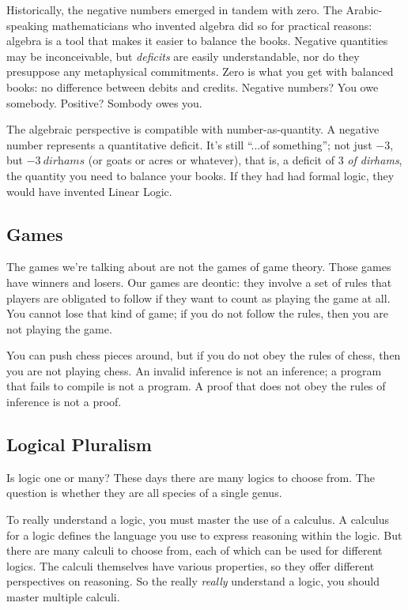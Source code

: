 \documentclass{article}
\begin{document}
Historically, the negative numbers emerged in tandem with zero. The
Arabic-speaking mathematicians who invented algebra did so for
practical reasons: algebra is a tool that makes it easier to balance
the books. Negative quantities may be inconceivable, but
\textit{deficits} are easily understandable, nor do they presuppose
any metaphysical commitments. Zero is what you get with balanced
books: no difference between debits and credits. Negative numbers? You
owe somebody. Positive? Sombody owes you.

The algebraic perspective is compatible with number-as-quantity. A
negative number represents a quantitative deficit. It's still ``...of
something''; not just \(-3\), but \(-3\ \textit{dirhams}\) (or goats
or acres or whatever), that is, a deficit of \(3\) \textit{of
  dirhams}, the quantity you need to balance your books. If they had had
formal logic, they would have invented Linear Logic.

\subsection{Games}

The games we're talking about are not the games of game theory. Those
games have winners and losers. Our games are deontic: they involve a
set of rules that players are obligated to follow if they want to
count as playing the game at all. You cannot lose that kind of game;
if you do not follow the rules, then you are not playing the game.

You can push chess pieces around, but if you do not obey the rules of
chess, then you are not playing chess. An invalid inference is not an
inference; a program that fails to compile is not a program. A proof
that does not obey the rules of inference is not a proof.

\subsection{Logical Pluralism}

Is logic one or many? These days there are many logics to choose from.
The question is whether they are all species of a single genus.

To really understand a logic, you must master the use of a calculus. A
calculus for a logic defines the language you use to express reasoning
within the logic. But there are many calculi to choose from, each of
which can be used for different logics. The calculi themselves have
various properties, so they offer different perspectives on reasoning.
So the really \textit{really} understand a logic, you should master
multiple calculi.
\end{document}

